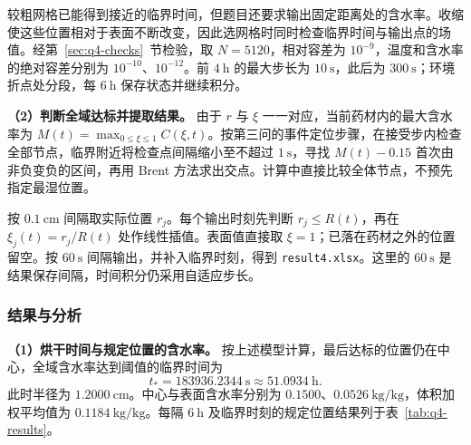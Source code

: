 \documentclass[UTF8,a4paper]{ctexart}
\begin{document}
较粗网格已能得到接近的临界时间，但题目还要求输出固定距离处的含水率。收缩使这些位置相对于表面不断改变，因此选网格时同时检查临界时间与输出点的场值。经第~\ref{sec:q4-checks}~节检验，取 \(N=5120\)，相对容差为 \(10^{-9}\)，温度和含水率的绝对容差分别为 \(10^{-10}\)、\(10^{-12}\)。前 \(4~\mathrm h\) 的最大步长为 \(10~\mathrm s\)，此后为 \(300~\mathrm s\)；环境折点处分段，每 \(6~\mathrm h\) 保存状态并继续积分。

\noindent\textbf{（2）判断全域达标并提取结果。}
由于 \(r\) 与 \(\xi\) 一一对应，当前药材内的最大含水率为 \(M(t)=\max_{0\le\xi\le1}C(\xi,t)\)。按第三问的事件定位步骤，在接受步内检查全部节点，临界附近将检查点间隔缩小至不超过 \(1~\mathrm s\)，寻找 \(M(t)-0.15\) 首次由非负变负的区间，再用 Brent 方法求出交点。计算中直接比较全体节点，不预先指定最湿位置。

按 \(0.1~\mathrm{cm}\) 间隔取实际位置 \(r_j\)。每个输出时刻先判断 \(r_j\le R(t)\)，再在 \(\xi_j(t)=r_j/R(t)\) 处作线性插值。表面值直接取 \(\xi=1\)；已落在药材之外的位置留空。按 \(60~\mathrm s\) 间隔输出，并补入临界时刻，得到 \texttt{result4.xlsx}。这里的 \(60~\mathrm s\) 是结果保存间隔，时间积分仍采用自适应步长。

\subsubsection{结果与分析}
\label{sec:q4-results}

\noindent\textbf{（1）烘干时间与规定位置的含水率。}
按上述模型计算，最后达标的位置仍在中心，全域含水率达到阈值的临界时间为
\begin{equation}
\boxed{t_*=183936.2344~\mathrm s\approx51.0934~\mathrm h}.
\label{eq:q4-time-result}
\end{equation}
此时半径为 \(1.2000~\mathrm{cm}\)。中心与表面含水率分别为 \(0.1500\)、\(0.0526~\mathrm{kg/kg}\)，体积加权平均值为 \(0.1184~\mathrm{kg/kg}\)。每隔 \(6~\mathrm h\) 及临界时刻的规定位置结果列于表~\ref{tab:q4-results}。
\end{document}
